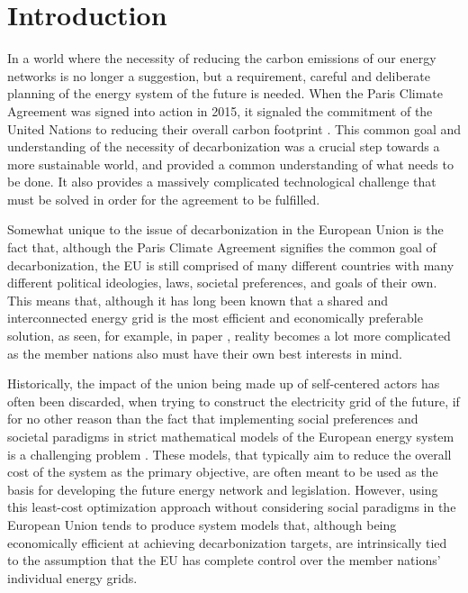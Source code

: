 \documentclass[preprint,12pt,nopreprintline]{elsarticle}
\begin{document}
\newpage

\tableofcontents

\newpage

\section{Introduction}
\noindent
In a world where the necessity of reducing the carbon emissions of our energy networks is no longer a suggestion, but a requirement, careful and deliberate planning of the energy system of the future is needed. When the Paris Climate Agreement was signed into action in 2015, it signaled the commitment of the United Nations to reducing their overall carbon footprint \cite{ParisAgreementUNFCCC}. This common goal and understanding of the necessity of decarbonization was a crucial step towards a more sustainable world, and provided a common understanding of what needs to be done. It also provides a massively complicated technological challenge that must be solved in order for the agreement to be fulfilled.

\medskip
\noindent Somewhat unique to the issue of decarbonization in the European Union is the fact that, although the Paris Climate Agreement signifies the common goal of decarbonization, the EU is still comprised of many different countries with many different political ideologies, laws, societal preferences, and goals of their own. This means that, although it has long been known that a shared and interconnected energy grid is the most efficient and economically preferable solution, as seen, for example, in paper \cite{rodriguezCostoptimalDesignSimplified2015a}, reality becomes a lot more complicated as the member nations also must have their own best interests in mind.

\medskip
\noindent Historically, the impact of the union being made up of self-centered actors has often been discarded, when trying to construct the electricity grid of the future, if for no other reason than the fact that implementing social preferences and societal paradigms in strict mathematical models of the European energy system is a challenging problem \cite{pfenningerEnergySystemsModeling2014}. These models, that typically aim to reduce the overall cost of the system as the primary objective, are often meant to be used as the basis for developing the future energy network and legislation. However, using this least-cost optimization approach without considering social paradigms in the European Union tends to produce system models that, although being economically efficient at achieving decarbonization targets, are intrinsically tied to the assumption that the EU has complete control over the member nations' individual energy grids.
\end{document}
